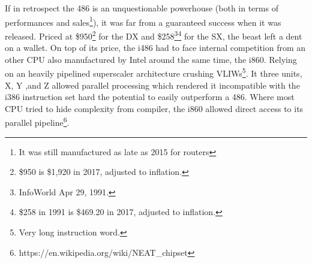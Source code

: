 If in retrospect the 486 is an unquestionable powerhouse (both in terms of performances and sales\footnote{It was still manufactured as late as 2015 for routers}), it was far from a guaranteed success when it was released. Priced at \$950\footnote{\$950 is \$1,920 in 2017, adjusted to inflation.} for the DX 
and \$258\footnote{InfoWorld Apr 29, 1991.}\footnote{\$258 in 1991 is \$469.20 in 2017, adjusted to inflation.} for the SX, the beast left a dent on a wallet. 
On top of its price, the i486 had to face internal competition from an other CPU also manufactured by Intel around the same time, the i860. Relying on an heavily pipelined superscaler architecture crushing VLIWs\footnote{Very long instruction word.}. It three units, X, Y ,and Z allowed parallel processing which rendered it incompatible with the i386 instruction set hard the potential to easily outperform a 486. Where most CPU tried to hide complexity from compiler, the i860 allowed direct access to its parallel pipeline\footnote{https://en.wikipedia.org/wiki/NEAT\_chipset}.\\
\par
